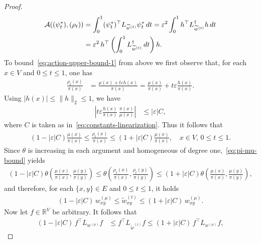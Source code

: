 \documentclass[10pt,a4paper]{amsart}
\begin{document}
\begin{proof}
\begin{align}
            \mathcal{A}((\psi_t^\ast), (\rho_t)) &= \int_0^{1} (\psi_t^\ast)^\top L_{\widetilde{w}^{(t)}} \psi_t^\ast \, dt = \varepsilon^2 \int_0^{1} h^\top L_{\widetilde{w}^{(t)}}^{\dagger} h \, dt\notag\\
            &= \varepsilon^2 \, h^\top \left( \int_0^{1} L_{\widetilde{w}^{(t)}}^{\dagger} \, dt \right) h.
        \end{align}
    To bound~\cref{eq:action-upper-bound-1} from above we first observe that, for each $x\in V$ and $0\le t\le 1$, one has
        \begin{align*}
            \frac{\rho_t(x)}{\pi(x)} &= \frac{\mu(x) + t \varepsilon h(x)}{\pi(x)} = \frac{\mu(x)}{\pi(x)} + t \varepsilon \frac{h(x)}{\pi(x)}.
        \end{align*}
    Using $|h(x)|\le \|h\|_2\le 1$, we have
        \begin{align*}
            \left|t \varepsilon \frac{h(x)}{\pi(x)}\,\frac{\pi(x)}{\mu(x)}\right| &\leq |\varepsilon| C,
        \end{align*}
    where $C$ is taken as in~\cref{eq:constants-linearization}. Thus it follows that
        \begin{align}\label{eq:pi-mu-bound}
            \left(1-|\varepsilon|C\right)\frac{\mu(x)}{\pi(x)} \le \frac{\rho_t(x)}{\pi(x)} \le \left(1+|\varepsilon|C\right)\frac{\mu(x)}{\pi(x)},\quad x\in V,\,0\le t\le 1.
        \end{align}
    Since $\theta$ is increasing in each argument and homogeneous of degree one,~\cref{eq:pi-mu-bound} yields
        \begin{align*}
            \left(1-|\varepsilon|C\right)\theta\left(\frac{\mu(x)}{\pi(x)},\frac{\mu(y)}{\pi(y)}\right)
            \le \theta\left(\frac{\rho_t(x)}{\pi(x)},\frac{\rho_t(y)}{\pi(y)}\right)
            \le \left(1+|\varepsilon|C\right)\theta\left(\frac{\mu(x)}{\pi(x)},\frac{\mu(y)}{\pi(y)}\right),
        \end{align*}
    and therefore, for each $\{x, y\}\in E$ and $0\le t\le 1$, it holds
        \begin{align*}
            (1 - |\varepsilon| C) \, w^{(\mu)}_{xy} \leq \widetilde{w}^{(t)}_{xy} \leq (1 + |\varepsilon| C) \, w^{(\mu)}_{xy}.
        \end{align*}
    Now let $f\in\mathbb{R}^{V}$ be arbitrary. It follows that
        \begin{align*}
            (1 - |\varepsilon| C) \, f^\top L_{w^{(\mu)}} f &\leq f^\top L_{\widetilde{w}^{(t)}} f \leq (1 + |\varepsilon| C) \, f^\top L_{w^{(\mu)}} f,

\end{align*}
\end{proof}
\end{document}
